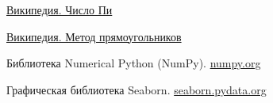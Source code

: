 \documentclass[a4paper,12pt]{article}
\begin{document}
\listoffigures

\listoftables

\begin{thebibliography}{9}

    \href{https://ru.wikipedia.org/wiki/%D0%9F%D0%B8_(%D1%87%D0%B8%D1%81%D0%BB%D0%BE)}{Википедия. Число Пи}  

    \href{https://ru.wikipedia.org/wiki/%D0%9C%D0%B5%D1%82%D0%BE%D0%B4_%D0%BF%D1%80%D1%8F%D0%BC%D0%BE%D1%83%D0%B3%D0%BE%D0%BB%D1%8C%D0%BD%D0%B8%D0%BA%D0%BE%D0%B2}{Википедия. Метод прямоугольников}

    Библиотека Numerical Python (NumPy). \href{https://numpy.org/}{numpy.org}

    Графическая библиотека Seaborn. \href{https://seaborn.pydata.org/generated/seaborn.lineplot.html}{seaborn.pydata.org}
\end{thebibliography}
\end{document}
